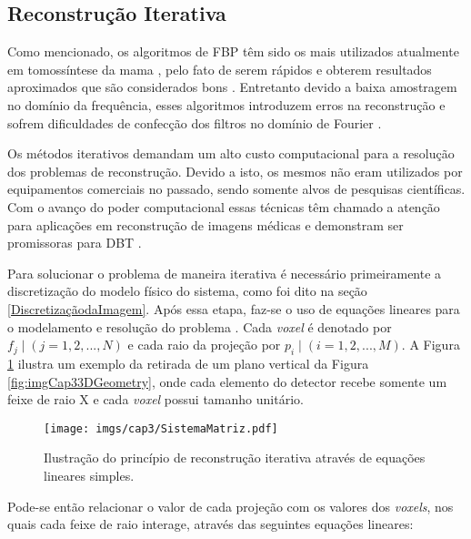 \subsection{Reconstrução Iterativa}

Como mencionado, os algoritmos de \acs{FBP} têm sido os mais utilizados atualmente em tomossíntese da mama \cite{michell2018role}, pelo fato de serem rápidos e obterem resultados aproximados que são considerados bons \cite{das2011penalized}. Entretanto devido a baixa amostragem no domínio da frequência, esses algoritmos introduzem erros na reconstrução e sofrem dificuldades de confecção dos filtros no domínio de Fourier \cite{xu2015statistical}.

Os métodos iterativos demandam um alto custo computacional para a resolução dos problemas de reconstrução. Devido a isto, os mesmos não eram utilizados por equipamentos comerciais no passado, sendo somente alvos de pesquisas científicas. Com o avanço do poder computacional essas técnicas têm chamado a atenção para aplicações em reconstrução de imagens médicas e demonstram ser promissoras para \acs{DBT} \cite{zeng2010medical,zheng2018detector}.

Para solucionar o problema de maneira iterativa é necessário primeiramente a discretização do modelo físico do sistema, como foi dito na seção \ref{DiscretizaçãodaImagem}. Após essa etapa, faz-se o uso de equações lineares para o modelamento e resolução do problema \cite[p. 125]{zeng2010medical}. Cada \textit{voxel} é denotado por $f_{j} \mid (j=1,2,...,N)$ e cada raio da projeção por $p_{i} \mid (i=1,2,...,M)$. A Figura \ref{fig:imgCap3SistemaMatriz} ilustra um exemplo da retirada de um plano vertical da Figura \ref{fig:imgCap33DGeometry}, onde cada elemento do detector recebe somente um feixe de raio X  e cada \textit{voxel} possui tamanho unitário.  

\begin{figure}[H]
	\caption{Ilustração do princípio de reconstrução iterativa através de equações lineares simples.}
	\begin{center}
		\texttt{[image: imgs/cap3/SistemaMatriz.pdf]}
	\end{center}
	\label{fig:imgCap3SistemaMatriz}
\end{figure} 

Pode-se então relacionar o valor de cada projeção com os valores dos \textit{voxels}, nos quais cada feixe de raio interage, através das seguintes equações lineares:

